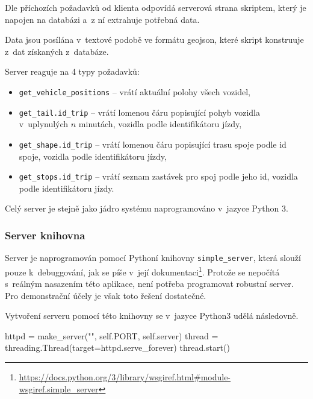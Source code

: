 Dle příchozích požadavků od klienta odpovídá serverová strana skriptem, který je napojen na databázi a~z ní extrahuje potřebná data.


\bigbreak


Data jsou posílána v~textové podobě ve formátu \gls{geojson}, které skript konstruuje z~dat získaných z~databáze.


\bigbreak


Server reaguje na 4 typy požadavků:


\begin{itemize}
	\item \verb-get_vehicle_positions- -- vrátí aktuální polohy všech vozidel,


	\item \verb-get_tail.id_trip- -- vrátí lomenou čáru popisující pohyb vozidla v~uplynulých $n$ minutách, vozidla podle identifikátoru jízdy,


	\item \verb-get_shape.id_trip- -- vrátí lomenou čáru popisující trasu spoje podle id spoje, vozidla podle identifikátoru jízdy,


	\item \verb-get_stops.id_trip- -- vrátí seznam zastávek pro spoj podle jeho id, vozidla podle identifikátoru jízdy.
\end{itemize}


Celý server je stejně jako jádro systému naprogramováno v~jazyce Python 3.


\subsubsection{Server knihovna}


Server je naprogramován pomocí Pythoní knihovny \verb-simple_server-, která slouží pouze k~debuggování, jak se píše v~její dokumentaci\footnote{\url{https://docs.python.org/3/library/wsgiref.html\#module-wsgiref.simple_server}}. Protože se nepočítá s~reálným nasazením této aplikace, není potřeba programovat robustní server. Pro demonstrační účely je však toto řešení dostatečné.


\bigbreak


Vytvoření serveru pomocí této knihovny se v~jazyce Python3 udělá následovně.


\begin{code}[frame=none]
httpd = make_server("", self.PORT, self.server)
thread = threading.Thread(target=httpd.serve_forever)
thread.start()
\end{code}


